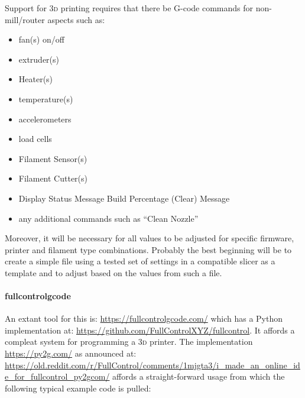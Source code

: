 \documentclass{ltxdoc}
\begin{document}
Support for \textsc{3d} printing requires that there be G-code commands for non-mill/router aspects such as:

\begin{itemize}
\item fan(s) on/off
\item extruder(s)
\item Heater(s)
\item temperature(s)
\item accelerometers
\item load cells
\item Filament Sensor(s)
\item Filament Cutter(s)
\item Display Status
\subitem Message
\subitem Build Percentage
\subitem (Clear) Message
\item any additional commands such as ``Clean Nozzle''
\end{itemize}

\noindent Moreover, it will be necessary for all values to be adjusted for specific firmware, printer and filament type combinations. Probably the best beginning will be to create a simple file using a tested set of settings in a compatible slicer as a template and to adjust based on the values from such a file.

\paragraph{fullcontrolgcode}

An extant tool for this is: \url{https://fullcontrolgcode.com/} which has a Python implementation at: \url{https://github.com/FullControlXYZ/fullcontrol}. It affords a compleat system for programming a \textsc{3d} printer. The implementation \url{https://py2g.com/} as announced at: \url{https://old.reddit.com/r/FullControl/comments/1mjgta3/i_made_an_online_ide_for_fullcontrol_py2gcom/} affords a straight-forward usage from which the following typical example code is pulled:
\end{document}
